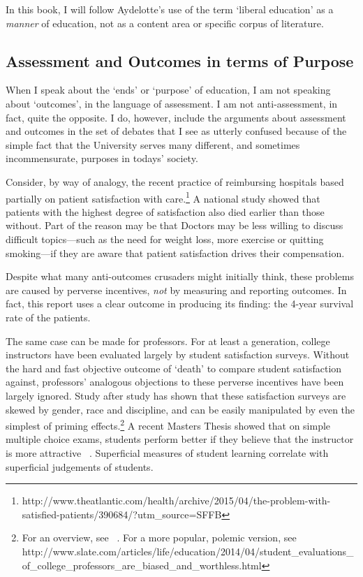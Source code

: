 In this book, I will follow Aydelotte's use of the term `liberal education' as a \emph{manner} of education, not as a content area or specific corpus of literature. 

\subsection{Assessment and Outcomes in terms of Purpose}
\label{assessmentandoutcomesintermsofpurpose}

When I speak about the `ends' or `purpose' of education, I am not speaking about `outcomes', in the language of assessment. I am not anti-assessment, in fact, quite the opposite. I do, however, include the arguments about assessment and outcomes in the set of debates that I see as utterly confused because of the simple fact that the University serves many different, and sometimes incommensurate, purposes in todays' society. 

Consider, by way of analogy, the recent practice of reimbursing hospitals based partially on patient satisfaction with care.\footnote{http:\slash \slash www.theatlantic.com\slash health\slash archive\slash 2015\slash 04\slash the-problem-with-satisfied-patients\slash 390684\slash ?utm\_source=SFFB} A national study showed that patients with the highest degree of satisfaction also died earlier than those without. Part of the reason may be that Doctors may be less willing to discuss difficult topics---such as the need for weight loss, more exercise or quitting smoking---if they are aware that patient satisfaction drives their compensation.

Despite what many anti-outcomes crusaders might initially think, these problems are caused by perverse incentives, \emph{not} by measuring and reporting outcomes. In fact, this report uses a clear outcome in producing its finding: the 4-year survival rate of the patients.

The same case can be made for professors. For at least a generation, college instructors have been evaluated largely by student satisfaction surveys. Without the hard and fast objective outcome of `death' to compare student satisfaction against, professors' analogous objections to these perverse incentives have been largely ignored. Study after study has shown that these satisfaction surveys are skewed by gender, race and discipline, and can be easily manipulated by even the simplest of priming effects.\footnote{For an overview, see ~\citep{Glymour:2003us}. For a more popular, polemic version, see http:\slash \slash www.slate.com\slash articles\slash life\slash education\slash 2014\slash 04\slash student\_evaluations\_of\_college\_professors\_are\_biased\_and\_worthless.html} A recent Masters Thesis showed that on simple multiple choice exams, students perform better if they believe that the instructor is more attractive ~\citep{Westfall:2015vv}. Superficial measures of student learning correlate with superficial judgements of students.

